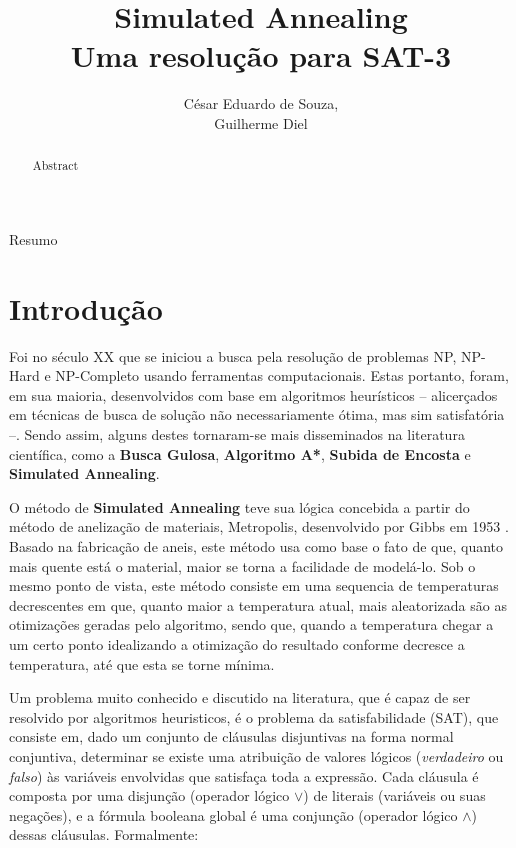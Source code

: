 \documentclass[12pt]{article}
\title{Simulated Annealing\\ Uma resolução para SAT-3}
\author{César Eduardo de Souza\inst{1},\\ Guilherme Diel\inst{1}}
\begin{document}
 

\maketitle

\begin{abstract}
  Abstract
\end{abstract}
     
\begin{resumo} 
  Resumo
\end{resumo}


\section{Introdução}

Foi no século XX que se iniciou a busca pela resolução de problemas NP, NP-Hard e NP-Completo usando ferramentas computacionais. 
%
Estas portanto, foram, em sua maioria, desenvolvidos com base em algoritmos heurísticos – alicerçados em técnicas de busca de solução não necessariamente ótima, mas sim satisfatória –. 
%
Sendo assim, alguns destes tornaram-se mais disseminados na literatura científica, como a \textbf{Busca Gulosa}, \textbf{Algoritmo A*}, \textbf{Subida de Encosta} e \textbf{Simulated Annealing}. 

O método de \textbf{Simulated Annealing} teve sua lógica concebida a partir do método de anelização de materiais, Metropolis, desenvolvido por Gibbs em 1953 \cite{Gibbs}.
%
Basado na fabricação de aneis, este método usa como base o fato de que, quanto mais quente está o material, maior se torna a facilidade de modelá-lo.
%
Sob o mesmo ponto de vista, este método consiste em uma sequencia de temperaturas decrescentes em que, quanto maior a temperatura atual, mais aleatorizada são as otimizações geradas pelo algoritmo, sendo que, quando a temperatura chegar a um certo ponto idealizando a otimização do resultado conforme decresce a temperatura, até que esta se torne mínima.

Um problema muito conhecido e discutido na literatura, que é capaz de ser resolvido por algoritmos heuristicos, é o problema da satisfabilidade (SAT), que consiste em, dado um conjunto de cláusulas disjuntivas na forma normal conjuntiva, determinar se existe uma atribuição de valores lógicos (\textit{verdadeiro} ou \textit{falso}) às variáveis envolvidas que satisfaça toda a expressão.
%
Cada cláusula é composta por uma disjunção (operador lógico $\lor$) de literais (variáveis ou suas negações), e a fórmula booleana global é uma conjunção (operador lógico $\land$) dessas cláusulas. Formalmente:
\end{document}
